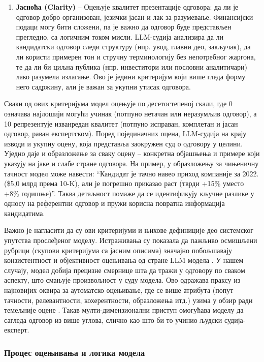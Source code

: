 \begin{enumerate}
    \item \textbf{Јасноћа (Clarity)} -- Оцењује квалитет презентације одговора: да ли је одговор добро организован, језички јасан и лак за разумевање. Финансијски подаци могу бити сложени, па је важно да одговор буде представљен прегледно, са логичним током мисли. LLM-судија анализира да ли кандидатски одговор следи структуру (нпр. увод, главни део, закључак), да ли користи примерен тон и стручну терминологију без непотребног жаргона, те да ли би циљна публика (нпр. инвеститори или пословни аналитичари) лако разумела излагање. Ово је једини критеријум који више гледа форму него садржину, али је важан за укупни утисак одговора.
\end{enumerate}

Сваки од ових критеријума модел оцењује по десетостепеној скали, где 0 означава најлошији могући учинак (потпуно нетачан или неразумљив одговор), а 10 репрезентује изванредан квалитет (потпуно исправан, комплетан и јасан одговор, раван експертском). Поред појединачних оцена, LLM-судија на крају изводи и укупну оцену, која представља заокружен суд о одговору у целини. Уједно даје и образложење за сваку оцену -- конкретна објашњења и примере који указују на јаке и слабе стране одговора. На пример, у образложењу за чињеничну тачност модел може навести: ``Кандидат је тачно навео приход компаније за 2022. (\$5,0 млрд према 10-K), али је погрешно приказао раст (тврди +15\% уместо +8\% годишње)''. Таква детаљност помаже да се идентификују кључне разлике у односу на референтни одговор и пружи корисна повратна информација кандидатима.

Важно је нагласити да су ови критеријуми и њихове дефиниције део системског упутства прослеђеног моделу. Истраживања су показала да пажљиво осмишљени рубрици (скупови критеријума са јасним описима) значајно побољшавају конзистентност и објективност оцењивања од стране LLM модела \cite{zheng_judging_llm_2023}. У нашем случају, модел добија прецизне смернице шта да тражи у одговору по сваком аспекту, што смањује произвољност у суду модела. Ово одражава праксу из најновијих оквира за аутоматско оцењивање, где се више атрибута (попут тачности, релевантности, кохерентности, образложења итд.) узима у обзир ради темељније оцене \cite{verga_replacing_judges_2024}. Такав мулти-димензионални приступ омогућава моделу да сагледа одговор из више углова, слично као што би то учинио људски судија-експерт.

\subsubsection{Процес оцењивања и логика модела}

